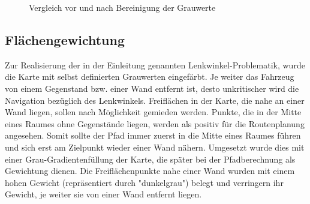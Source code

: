 \begin{figure}
\caption{Vergleich vor und nach Bereinigung der Grauwerte}
\label{fig:ungenaueKarte}
\end{figure}


\subsection{Flächengewichtung}
\label{sec:gewichtung}

Zur Realisierung der in der Einleitung genannten Lenkwinkel-Problematik, wurde die Karte mit selbst definierten Grauwerten eingefärbt. Je weiter das Fahrzeug von einem Gegenstand bzw. einer Wand entfernt ist, desto unkritischer wird die Navigation bezüglich des Lenkwinkels.
Freiflächen in der Karte, die nahe an einer Wand liegen, sollen nach Möglichkeit gemieden werden. Punkte, die in der Mitte eines Raumes ohne Gegenstände liegen, werden als positiv für die Routenplanung angesehen. 
Somit sollte der Pfad immer zuerst in die Mitte eines Raumes führen und sich erst am Zielpunkt wieder einer Wand nähern. 
Umgesetzt wurde dies mit einer Grau-Gradientenfüllung der Karte, die später bei der Pfadberechnung als Gewichtung dienen. Die Freiflächenpunkte nahe einer Wand wurden mit einem hohen Gewicht (repräsentiert durch "dunkelgrau") belegt und verringern ihr Gewicht, je weiter sie von einer Wand entfernt liegen. 

